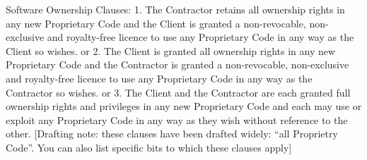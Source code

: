\documentclass[a4paper,12pt]{article}
\begin{document}
Software Ownership Clauses:
1.	The Contractor retains all ownership rights in any new Proprietary Code and the Client is granted a non-revocable, non-exclusive and royalty-free licence to use any Proprietary Code in any way as the Client so wishes.
or
2.	The Client is granted all ownership rights in any new Proprietary Code and the Contractor is granted a non-revocable, non-exclusive and royalty-free licence to use any Proprietary Code in any way as the Contractor so wishes.
or
3.	The Client and the Contractor are each granted full ownership rights and privileges in any new Proprietary Code and each may use or exploit any Proprietary Code in any way as they wish without reference to the other.
[Drafting note: these clauses have been drafted widely:  “all Proprietry Code”.  You can also list specific bits to which these clauses apply] 
\end{document}
